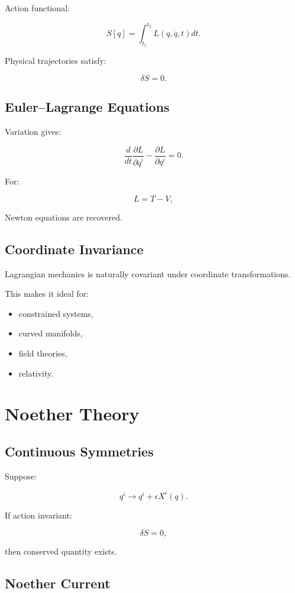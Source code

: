 \documentclass[11pt]{book}
\begin{document}
Action functional:

\[
S[q]
=
\int_{t_1}^{t_2}
L(q,\dot q,t)dt.
\]

Physical trajectories satisfy:

\[
\delta S=0.
\]

\section{Euler--Lagrange Equations}

Variation gives:

\[
\frac{d}{dt}
\frac{\partial L}{\partial \dot q^i}
-
\frac{\partial L}{\partial q^i}
=0.
\]

For:

\[
L=T-V,
\]

Newton equations are recovered.

\section{Coordinate Invariance}

Lagrangian mechanics is naturally covariant under coordinate transformations.

This makes it ideal for:

\begin{itemize}
\item constrained systems,
\item curved manifolds,
\item field theories,
\item relativity.
\end{itemize}

\chapter{Noether Theory}

\section{Continuous Symmetries}

Suppose:

\[
q^i \to q^i+\epsilon X^i(q).
\]

If action invariant:

\[
\delta S=0,
\]

then conserved quantity exists.

\section{Noether Current}
\end{document}
